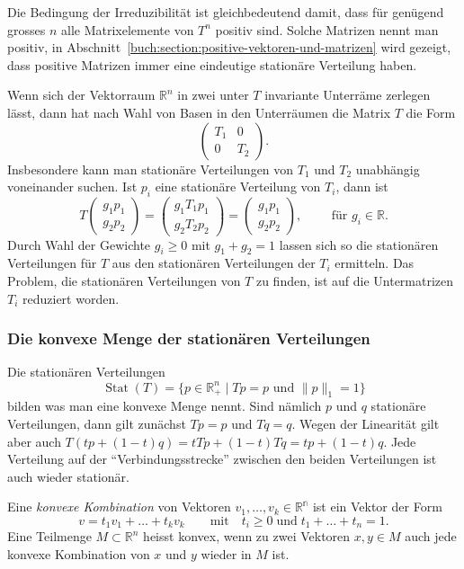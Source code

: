 Die Bedingung der Irreduzibilität ist gleichbedeutend damit,
dass für genügend grosses $n$ alle Matrixelemente von $T^n$ positiv sind.
Solche Matrizen nennt man positiv, 
in Abschnitt~\ref{buch:section:positive-vektoren-und-matrizen}
wird gezeigt, dass positive Matrizen immer eine eindeutige
stationäre Verteilung haben.

Wenn sich der Vektorraum $\mathbb{R}^n$ in zwei unter $T$ invariante
Unterräme zerlegen lässt, dann hat nach Wahl von Basen in den Unterräumen
die Matrix $T$ die Form
\[
\left(
\begin{array}{c|c}
T_1&0\\
\hline
0&T_2
\end{array}
\right).
\]
Insbesondere kann man stationäre Verteilungen von $T_1$ und $T_2$ 
unabhängig voneinander suchen.
Ist $p_i$ eine stationäre Verteilung von $T_i$, dann ist
\[
T
\left(
\begin{array}{c}
g_1p_1\\
\hline g_2p_2
\end{array}
\right)
=
\left(
\begin{array}{c}
g_1T_1p_1\\
\hline
g_2T_2p_2
\end{array}
\right)
=
\left(
\begin{array}{c}
g_1p_1\\
\hline
g_2p_2
\end{array}
\right),\qquad
\text{ für $g_i\in\mathbb{R}$.}
\]
Durch Wahl der Gewichte $g_i\ge 0$ mit $g_1+g_2=1$ lassen sich so
die stationären Verteilungen für $T$ aus den stationären Verteilungen
der $T_i$ ermitteln.
Das Problem, die stationären Verteilungen von $T$ zu finden, ist
auf die Untermatrizen $T_i$ reduziert worden.

\subsubsection{Die konvexe Menge der stationären Verteilungen}
Die stationären Verteilungen
\[
\operatorname{Stat}(T)
=
\{
p\in\mathbb R_+^n\;|\; \text{$Tp=p $ und $\|p\|_1=1$}
\}
\]
bilden was man eine konvexe Menge nennt.
Sind nämlich $p$ und $q$ stationäre Verteilungen, dann gilt zunächst
$Tp=p$ und $Tq=q$.
Wegen der Linearität gilt aber auch $T(tp+(1-t)q)=tTp + (1-t)Tq
=tp+(1-t)q$.
Jede Verteilung auf der ``Verbindungsstrecke'' zwischen den beiden
Verteilungen ist auch wieder stationär.

\begin{definition}
Eine {\em konvexe Kombination} von Vektoren $v_1,\dots,v_k\in\mathbb{R^n}$
ist ein Vektor der Form
\[
v=t_1v_1+\dots + t_kv_k
\qquad\text{mit}\quad
t_i\ge 0\;\text{und}\;
t_1+\dots+t_n = 1.
\]
%
Eine Teilmenge $M\subset \mathbb{R}^n$ heisst konvex, wenn zu
zwei Vektoren $x,y\in M$ auch jede konvexe Kombination von $x$ und $y$
wieder in $M$ ist.
%
\end{definition}

